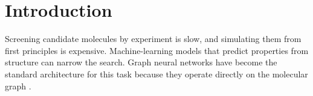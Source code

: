 \chapter{Introduction}
\label{ch:introduction}

Screening candidate molecules by experiment is slow, and simulating them from first principles is
expensive. Machine-learning models that predict properties from structure can narrow the search.
Graph neural networks have become the standard architecture for this task because they operate
directly on the molecular graph \citep{gilmer2017}.
